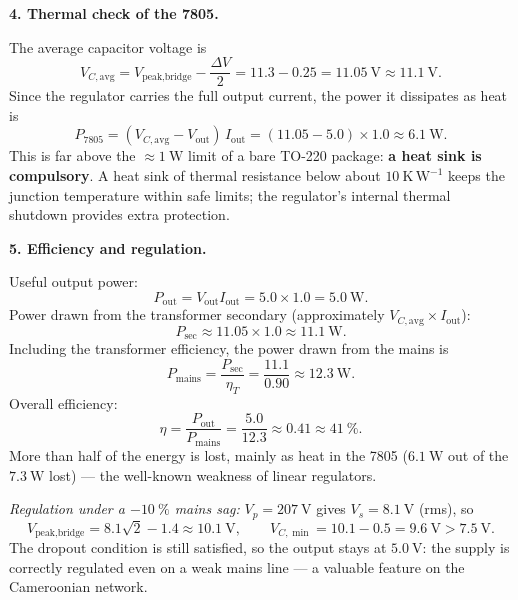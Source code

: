\documentclass[11pt]{article}
\begin{document}
\textbf{4. Thermal check of the 7805.}\par
The average capacitor voltage is
\[
V_{C,\text{avg}} = V_{\text{peak,bridge}} - \frac{\Delta V}{2} = 11.3 - 0.25 = 11.05\ \mathrm{V} \approx 11.1\ \mathrm{V}.
\]
Since the regulator carries the full output current, the power it dissipates as heat is
\[
P_{7805} = (V_{C,\text{avg}} - V_{\text{out}})\,I_{\text{out}} = (11.05 - 5.0) \times 1.0 \approx 6.1\ \mathrm{W}.
\]
This is far above the $\approx 1\ \mathrm{W}$ limit of a bare TO-220 package: \textbf{a heat sink is compulsory}. A heat sink of thermal resistance below about $10\ \mathrm{K\,W^{-1}}$ keeps the junction temperature within safe limits; the regulator's internal thermal shutdown provides extra protection.

\textbf{5. Efficiency and regulation.}\par
Useful output power:
\[
P_{\text{out}} = V_{\text{out}} I_{\text{out}} = 5.0 \times 1.0 = 5.0\ \mathrm{W}.
\]
Power drawn from the transformer secondary (approximately $V_{C,\text{avg}} \times I_{\text{out}}$):
\[
P_{\text{sec}} \approx 11.05 \times 1.0 \approx 11.1\ \mathrm{W}.
\]
Including the transformer efficiency, the power drawn from the mains is
\[
P_{\text{mains}} = \frac{P_{\text{sec}}}{\eta_T} = \frac{11.1}{0.90} \approx 12.3\ \mathrm{W}.
\]
Overall efficiency:
\[
\eta = \frac{P_{\text{out}}}{P_{\text{mains}}} = \frac{5.0}{12.3} \approx 0.41 \approx 41\ \%.
\]
More than half of the energy is lost, mainly as heat in the 7805 ($6.1\ \mathrm{W}$ out of the $7.3\ \mathrm{W}$ lost) — the well-known weakness of linear regulators.\par
\emph{Regulation under a $-10\ \%$ mains sag:} $V_p = 207\ \mathrm{V}$ gives $V_s = 8.1\ \mathrm{V}$ (rms), so
\[
V_{\text{peak,bridge}} = 8.1\sqrt{2} - 1.4 \approx 10.1\ \mathrm{V}, \qquad V_{C,\min} = 10.1 - 0.5 = 9.6\ \mathrm{V} > 7.5\ \mathrm{V}.
\]
The dropout condition is still satisfied, so the output stays at $5.0\ \mathrm{V}$: the supply is correctly regulated even on a weak mains line — a valuable feature on the Cameroonian network.
\end{document}

